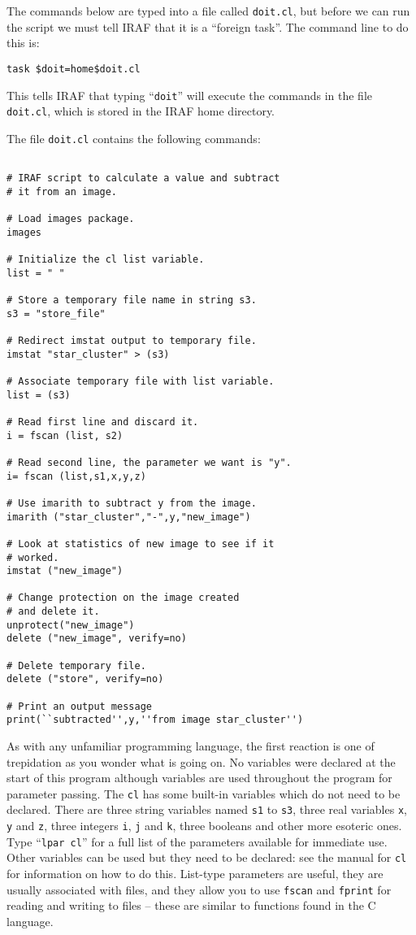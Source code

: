 The commands below are typed into a file called {\tt doit.cl}, but before we
can run the script we must tell IRAF that it is a ``foreign task''. The
command line to do this is:

{\tt task \$doit=home\$doit.cl}

This tells IRAF that typing ``{\tt doit}'' will execute the commands in
the file {\tt doit.cl}, which is stored in the IRAF home directory.

The file {\tt doit.cl} contains the following commands:

{\footnotesize
\begin{verbatim}

# IRAF script to calculate a value and subtract
# it from an image.

# Load images package.
images

# Initialize the cl list variable.
list = " "

# Store a temporary file name in string s3.
s3 = "store_file"

# Redirect imstat output to temporary file.
imstat "star_cluster" > (s3)

# Associate temporary file with list variable.
list = (s3)

# Read first line and discard it.
i = fscan (list, s2)

# Read second line, the parameter we want is "y".
i= fscan (list,s1,x,y,z)

# Use imarith to subtract y from the image.
imarith ("star_cluster","-",y,"new_image")

# Look at statistics of new image to see if it 
# worked.
imstat ("new_image")

# Change protection on the image created
# and delete it.
unprotect("new_image")
delete ("new_image", verify=no)

# Delete temporary file.
delete ("store", verify=no)

# Print an output message
print(``subtracted'',y,''from image star_cluster'')

\end{verbatim}
}

As with any unfamiliar programming language, the first reaction is one
of trepidation as you wonder what is going on. No variables were
declared at the start of this program although variables are used
throughout the program for parameter passing. The {\tt cl} has some built-in
variables which do not need to be declared. There are three string
variables named {\tt s1} to {\tt s3}, three real variables
{\tt x}, {\tt y} and {\tt z}, three
integers {\tt i}, {\tt j} and {\tt k},
three booleans and other more esoteric ones. Type
``{\tt lpar cl}'' for a full list of the parameters available for
immediate use. Other variables can be used but they need to be
declared: see the manual for {\tt cl} for information on how to do
this. List-type parameters are useful, they are usually associated
with files, and they allow you to use {\tt fscan} and {\tt fprint}
for reading and
writing to files -- these are similar to functions found in the C
language.

